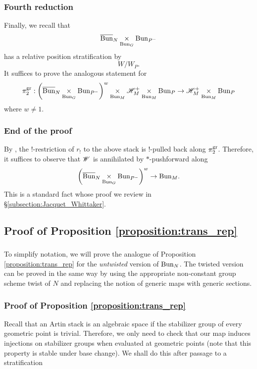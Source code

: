 \subsubsection{Fourth reduction} Finally, we recall that  
  \[\overline{\mathrm{Bun}}_N \underset{\mathrm{Bun}_G}{\times} \mathrm{Bun}_{P^-}\]
has a relative position stratification by
  \[W/W_P.\]
It suffices to prove the analogous statement for
  \[
  \pi_2^{\mathrm{gr}} : \left( \overline{\mathrm{Bun}}_N \underset{\mathrm{Bun}_G}{\times} \mathrm{Bun}_{P^-} \right)^w \underset{\mathrm{Bun}_M}{\times} \mathscr{H}_M^+ \underset{\mathrm{Bun}_M}{\times} \mathrm{Bun}_P  \to \mathscr{H}_M^+ \underset{\mathrm{Bun}_M}{\times} \mathrm{Bun}_P
  \]
where $w \neq 1$.

\subsubsection{End of the proof} By \cite[Lemma 4.2.1]{lin_nearby_cycles}, the !-restriction of $r_!$ to the above stack is !-pulled back along $\pi_2^{\mathrm{gr}}$. Therefore, it suffices to observe that $\mathscr{W}$ is annihilated by $*$-pushforward along
    \[
    \left( \overline{\mathrm{Bun}}_N \underset{\mathrm{Bun}_G}{\times} \mathrm{Bun}_{P^-} \right)^w 
    \to \mathrm{Bun}_M.
    \]
This is a standard fact whose proof we review in \S\ref{subsection:Jacquet_Whittaker}.

\subsection{Proof of Proposition \ref{proposition:trans_rep}}

\subsubsection{} To simplify notation, we will prove the analogue of Proposition \ref{proposition:trans_rep} for the \emph{untwisted} version of $\mathrm{Bun}_N$. The twisted version can be proved in the same way by using the appropriate non-constant group scheme twist of $N$ and replacing the notion of generic maps with generic sections.

\subsubsection{Proof of Proposition \ref{proposition:trans_rep}} Recall that an Artin stack is an algebraic space if the stabilizer group of every geometric point is trivial. Therefore, we only need to check that our map induces injections on stabilizer groups when evaluated at geometric points (note that this property is stable under base change). We shall do this after passage to a stratification

